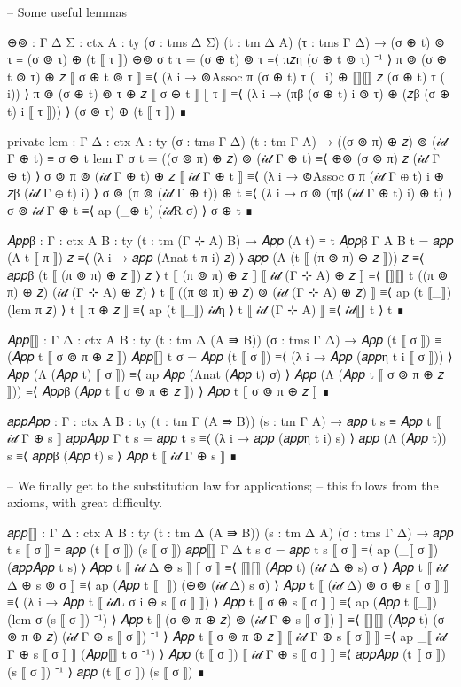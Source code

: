 \begin{code}[hide]

  -- Some useful lemmas

  ⊕⊚ : {Γ Δ Σ : ctx} {A : ty} (σ : tms Δ Σ) (t : tm Δ A) (τ : tms Γ Δ) →
    (σ ⊕ t) ⊚ τ ≡ (σ ⊚ τ) ⊕ (t ⟦ τ ⟧)
  ⊕⊚ σ t τ =
    (σ ⊕ t) ⊚ τ
      ≡⟨ π𝑧η (σ ⊕ t ⊚ τ) ⁻¹ ⟩
    π ⊚ (σ ⊕ t ⊚ τ) ⊕ 𝑧 ⟦ σ ⊕ t ⊚ τ ⟧
      ≡⟨ (λ i → ⊚Assoc π (σ ⊕ t) τ (~ i) ⊕ ⟦⟧⟦⟧ 𝑧 (σ ⊕ t) τ (~ i)) ⟩
    π ⊚ (σ ⊕ t) ⊚ τ ⊕ 𝑧 ⟦ σ ⊕ t ⟧ ⟦ τ ⟧
      ≡⟨ (λ i → (πβ (σ ⊕ t) i ⊚ τ) ⊕ (𝑧β (σ ⊕ t) i ⟦ τ ⟧)) ⟩
    (σ ⊚ τ) ⊕ (t ⟦ τ ⟧)
      ∎

  private
    lem : {Γ Δ : ctx} {A : ty} (σ : tms Γ Δ) (t : tm Γ A) →
      ((σ ⊚ π) ⊕ 𝑧) ⊚ (𝒾𝒹 Γ ⊕ t) ≡ σ ⊕ t
    lem {Γ} σ t =
      ((σ ⊚ π) ⊕ 𝑧) ⊚ (𝒾𝒹 Γ ⊕ t)
        ≡⟨ ⊕⊚ (σ ⊚ π) 𝑧 (𝒾𝒹 Γ ⊕ t) ⟩
      σ ⊚ π ⊚ (𝒾𝒹 Γ ⊕ t) ⊕ 𝑧 ⟦ 𝒾𝒹 Γ ⊕ t ⟧
        ≡⟨ (λ i → ⊚Assoc σ π (𝒾𝒹 Γ ⊕ t) i ⊕ 𝑧β (𝒾𝒹 Γ ⊕ t) i) ⟩
      σ ⊚ (π ⊚ (𝒾𝒹 Γ ⊕ t)) ⊕ t
        ≡⟨ (λ i → σ ⊚ (πβ (𝒾𝒹 Γ ⊕ t) i) ⊕ t) ⟩
      σ ⊚ 𝒾𝒹 Γ ⊕ t
        ≡⟨ ap (_⊕ t) (𝒾𝒹R σ) ⟩
      σ ⊕ t
        ∎

  𝐴𝑝𝑝β : {Γ : ctx} {A B : ty} (t : tm (Γ ⊹ A) B) →
    𝐴𝑝𝑝 (Λ t) ≡ t
  𝐴𝑝𝑝β {Γ} {A} {B} t =
    𝑎𝑝𝑝 (Λ t ⟦ π ⟧) 𝑧
      ≡⟨ (λ i → 𝑎𝑝𝑝 (Λnat t π i) 𝑧) ⟩
    𝑎𝑝𝑝 (Λ (t ⟦ (π ⊚ π) ⊕ 𝑧 ⟧)) 𝑧
      ≡⟨ 𝑎𝑝𝑝β (t ⟦ (π ⊚ π) ⊕ 𝑧 ⟧) 𝑧 ⟩
    t ⟦ (π ⊚ π) ⊕ 𝑧 ⟧ ⟦ 𝒾𝒹 (Γ ⊹ A) ⊕ 𝑧 ⟧
      ≡⟨ ⟦⟧⟦⟧ t ((π ⊚ π) ⊕ 𝑧) (𝒾𝒹 (Γ ⊹ A) ⊕ 𝑧) ⟩
    t ⟦ ((π ⊚ π) ⊕ 𝑧) ⊚ (𝒾𝒹 (Γ ⊹ A) ⊕ 𝑧) ⟧
      ≡⟨ ap (t ⟦_⟧) (lem π 𝑧) ⟩
    t ⟦ π ⊕ 𝑧 ⟧
      ≡⟨ ap (t ⟦_⟧) 𝒾𝒹η ⟩
    t ⟦ 𝒾𝒹 (Γ ⊹ A) ⟧
      ≡⟨ 𝒾𝒹⟦⟧ t ⟩
    t
      ∎

  𝐴𝑝𝑝⟦⟧ : {Γ Δ : ctx} {A B : ty} (t : tm Δ (A ⇛ B)) (σ : tms Γ Δ) →
    𝐴𝑝𝑝 (t ⟦ σ ⟧) ≡ (𝐴𝑝𝑝 t ⟦ σ ⊚ π ⊕ 𝑧 ⟧)
  𝐴𝑝𝑝⟦⟧ t σ =
    𝐴𝑝𝑝 (t ⟦ σ ⟧)
      ≡⟨ (λ i → 𝐴𝑝𝑝 (𝑎𝑝𝑝η t i ⟦ σ ⟧)) ⟩
    𝐴𝑝𝑝 (Λ (𝐴𝑝𝑝 t) ⟦ σ ⟧)
      ≡⟨ ap 𝐴𝑝𝑝 (Λnat (𝐴𝑝𝑝 t) σ) ⟩
    𝐴𝑝𝑝 (Λ (𝐴𝑝𝑝 t ⟦ σ ⊚ π ⊕ 𝑧 ⟧))
      ≡⟨ 𝐴𝑝𝑝β (𝐴𝑝𝑝 t ⟦ σ ⊚ π ⊕ 𝑧 ⟧) ⟩
    𝐴𝑝𝑝 t ⟦ σ ⊚ π ⊕ 𝑧 ⟧
      ∎

  𝑎𝑝𝑝𝐴𝑝𝑝 : {Γ : ctx} {A B : ty} (t : tm Γ (A ⇛ B)) (s : tm Γ A) →
    𝑎𝑝𝑝 t s ≡ 𝐴𝑝𝑝 t ⟦ 𝒾𝒹 Γ ⊕ s ⟧
  𝑎𝑝𝑝𝐴𝑝𝑝 {Γ} t s =
    𝑎𝑝𝑝 t s
      ≡⟨ (λ i → 𝑎𝑝𝑝 (𝑎𝑝𝑝η t i) s) ⟩
    𝑎𝑝𝑝 (Λ (𝐴𝑝𝑝 t)) s
      ≡⟨ 𝑎𝑝𝑝β (𝐴𝑝𝑝 t) s ⟩
    𝐴𝑝𝑝 t ⟦ 𝒾𝒹 Γ ⊕ s ⟧
      ∎

  -- We finally get to the substitution law for applications;
  -- this follows from the axioms, with great difficulty.

  𝑎𝑝𝑝⟦⟧ : {Γ Δ : ctx} {A B : ty} (t : tm Δ (A ⇛ B)) (s : tm Δ A) (σ : tms Γ Δ) →
    𝑎𝑝𝑝 t s ⟦ σ ⟧ ≡ 𝑎𝑝𝑝 (t ⟦ σ ⟧) (s ⟦ σ ⟧)
  𝑎𝑝𝑝⟦⟧ {Γ} {Δ} t s σ =
    𝑎𝑝𝑝 t s ⟦ σ ⟧
      ≡⟨ ap (_⟦ σ ⟧) (𝑎𝑝𝑝𝐴𝑝𝑝 t s) ⟩
    𝐴𝑝𝑝 t ⟦ 𝒾𝒹 Δ ⊕ s ⟧ ⟦ σ ⟧
      ≡⟨ ⟦⟧⟦⟧ (𝐴𝑝𝑝 t) (𝒾𝒹 Δ  ⊕ s) σ ⟩
    𝐴𝑝𝑝 t ⟦ 𝒾𝒹 Δ ⊕ s ⊚ σ ⟧
      ≡⟨ ap (𝐴𝑝𝑝 t ⟦_⟧) (⊕⊚ (𝒾𝒹 Δ) s σ) ⟩
    𝐴𝑝𝑝 t ⟦ (𝒾𝒹 Δ) ⊚ σ ⊕ s ⟦ σ ⟧ ⟧
      ≡⟨ (λ i → 𝐴𝑝𝑝 t ⟦ 𝒾𝒹L σ i ⊕ s ⟦ σ ⟧ ⟧) ⟩
    𝐴𝑝𝑝 t ⟦ σ ⊕ s ⟦ σ ⟧ ⟧
      ≡⟨ ap (𝐴𝑝𝑝 t ⟦_⟧) (lem σ (s ⟦ σ ⟧) ⁻¹) ⟩
    𝐴𝑝𝑝 t ⟦ (σ ⊚ π ⊕ 𝑧) ⊚ (𝒾𝒹 Γ ⊕ s ⟦ σ ⟧) ⟧
      ≡⟨ ⟦⟧⟦⟧ (𝐴𝑝𝑝 t) (σ ⊚ π ⊕ 𝑧) (𝒾𝒹 Γ ⊕ s ⟦ σ ⟧) ⁻¹ ⟩
    𝐴𝑝𝑝 t ⟦ σ ⊚ π ⊕ 𝑧 ⟧ ⟦ 𝒾𝒹 Γ ⊕ s ⟦ σ ⟧ ⟧
      ≡⟨ ap _⟦ 𝒾𝒹 Γ ⊕ s ⟦ σ ⟧ ⟧ (𝐴𝑝𝑝⟦⟧ t σ ⁻¹) ⟩
    𝐴𝑝𝑝 (t ⟦ σ ⟧) ⟦ 𝒾𝒹 Γ ⊕ s ⟦ σ ⟧ ⟧
      ≡⟨ 𝑎𝑝𝑝𝐴𝑝𝑝 (t ⟦ σ ⟧) (s ⟦ σ ⟧) ⁻¹ ⟩
    𝑎𝑝𝑝 (t ⟦ σ ⟧) (s ⟦ σ ⟧)
      ∎


\end{code}
